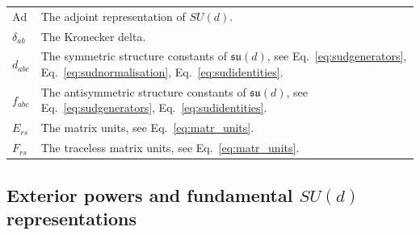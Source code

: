 \documentclass[11pt,letterpaper]{article}
\theoremstyle{plain}
\theoremstyle{plain}
\theoremstyle{plain}
\theoremstyle{plain}
\theoremstyle{plain}
\theoremstyle{plain}
\theoremstyle{plain}
\theoremstyle{definition}
\theoremstyle{plain}
\begin{document}
\begin{tabular}{@{}ll@{}}
\parbox[t]{0.22\textwidth}{$\mathrm{Ad}$} & \parbox[t]{0.72\textwidth}{The adjoint representation of $SU(d)$.} \\[0.6em]

\parbox[t]{0.22\textwidth}{$\delta_{a b}$} & \parbox[t]{0.72\textwidth}{The Kronecker delta.} \\[0.6em]

\parbox[t]{0.22\textwidth}{$d_{abc}$} & \parbox[t]{0.72\textwidth}{The symmetric structure constants of $\mathfrak{su}(d)$, see Eq.~\eqref{eq:sudgenerators}, Eq.~\eqref{eq:sudnormalisation}, Eq.~\eqref{eq:sudidentities}.} \\[0.6em]

\parbox[t]{0.22\textwidth}{$f_{abc}$} & \parbox[t]{0.72\textwidth}{The antisymmetric structure constants of $\mathfrak{su}(d)$, see Eq.~\eqref{eq:sudgenerators}, Eq.~\eqref{eq:sudidentities}.} \\[0.6em]

\parbox[t]{0.22\textwidth}{$E_{rs}$} & \parbox[t]{0.72\textwidth}{The matrix units, see Eq.~\eqref{eq:matr_units}.} \\[0.6em]

\parbox[t]{0.22\textwidth}{$F_{rs}$} & \parbox[t]{0.72\textwidth}{The traceless matrix units, see Eq.~\eqref{eq:matr_units}.} \\[0.6em]

\end{tabular}


\subsection*{Exterior powers and fundamental \(SU(d)\) representations}
\end{document}
